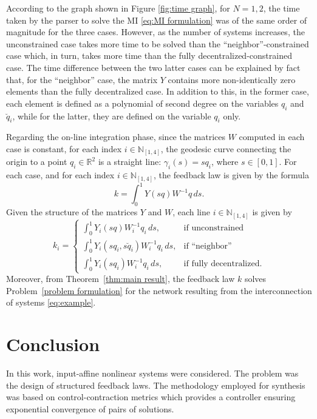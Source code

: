 \documentclass[10pt,twocolumn,twoside]{IEEEtran}
\theoremstyle{plain}
\theoremstyle{definition}
\theoremstyle{remark}
\begin{document}
According to the graph shown in Figure \ref{fig:time graph}, for $N=1,2$, the time taken by the parser to solve the MI \eqref{eq:MI formulation} was of the same order of magnitude for the three cases. However, as the number of systems increases, the unconstrained case takes more time to be solved than the ``neighbor''-constrained case which, in turn, takes more time than the fully decentralized-constrained case. The time difference between the two latter cases can be explained by fact that, for the ``neighbor'' case, the matrix $Y$ contains more non-identically zero elements than the fully decentralized case. In addition to this, in the former case, each element is defined as a polynomial of second degree on the variables $q_i$ and $\breve{q}_i$, while for the latter, they are defined on the variable $q_i$ only.

Regarding the on-line integration phase, since the matrices $W$ computed in each case is  constant, for each index $i\in\mathbb{N}_{[1,4]}$, the geodesic curve connecting the origin to a point $q_i\in\mathbb{R}^2$ is a straight line: $\gamma_i(s)=sq_i$, where $s\in[0,1]$. For each case, and for each index $i\in\mathbb{N}_{[1,4]}$, the feedback law is  given by the formula
\begin{equation*}
	k= \int_0^1Y(sq)W^{-1}q\,ds.
\end{equation*}
Given the structure of the matrices $Y$ and $W$, each line $i\in\mathbb{N}_{[1,4]}$ is given by
\begin{equation*}
k_i=\begin{cases}
	\displaystyle\int_0^1Y_i(sq)W_i^{-1}q_i\,ds,&\text{if unconstrained}\\
	\displaystyle\int_0^1Y_i(sq_i,s\breve{q}_i)W_i^{-1}q_i\,ds,&\text{if ``neighbor''}\\
	\displaystyle\int_0^1Y_i(sq_i)W_i^{-1}q_i\,ds,&\text{if fully decentralized.}
\end{cases}
\end{equation*}
Moreover, from Theorem~\ref{thm:main result}, the feedback law $k$ solves Problem~\ref{problem formulation} for the network resulting from the interconnection of systems \eqref{eq:example}.


\section{Conclusion}\label{sec:Conclusion}

In this work, input-affine nonlinear systems were considered. The problem was the design of structured feedback laws. The methodology employed for synthesis was based on control-contraction metrics which provides a controller ensuring exponential convergence of pairs of solutions.
\end{document}

